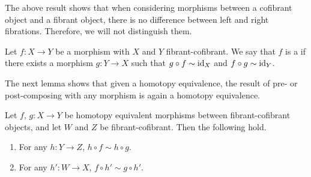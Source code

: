 \documentclass[main.tex]{subfiles}
\begin{document}
The above result shows that when considering morphisms between a cofibrant object and a fibrant object, there is no difference between left and right fibrations. Therefore, we will not distinguish them.

\begin{definition}
  \label{def:homotopy_equivalence_model_category}
  Let $f\colon X \to Y$ be a morphism with $X$ and $Y$ fibrant-cofibrant. We say that $f$ is a  if there exists a morphism $g\colon Y \to X$ such that $g \circ f \sim \mathrm{id}_{X}$ and $f \circ g \sim \mathrm{id}_{Y}$.
\end{definition}

The next lemma shows that given a homotopy equivalence, the result of pre- or post-composing with any morphism is again a homotopy equivalence.
\begin{lemma}
  \label{lemma:composition_with_any_morphism_preserves_homotopy_equivalence}
  Let $f$, $g\colon X \to Y$ be homotopy equivalent morphisms between fibrant-cofibrant objects, and let $W$ and $Z$ be fibrant-cofibrant. Then the following hold.
  \begin{enumerate}
    \item For any $h\colon Y \to Z$, $h \circ f \sim h \circ g$.

    \item For any $h'\colon W \to X$, $f \circ h' \sim g \circ h'$.
  \end{enumerate}
\end{lemma}
\end{document}
